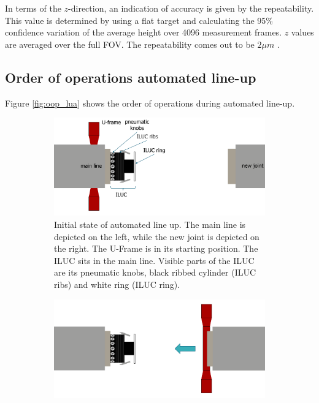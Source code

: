 In terms of the $z$-direction, an indication of accuracy is given by the repeatability. This value is determined by using a flat target and calculating the 95\% confidence variation of the average height over 4096 measurement frames. $z$ values are averaged over the full FOV. The repeatability comes out to be $2 \mu m$ \cite{gocator2650datasheet}.

\newpage
\subsection{Order of operations automated line-up} \label{ssec:oop_lua}
Figure \ref{fig:oop_lua} shows the order of operations during automated line-up.
\begin{figure}[H]
    \centering
    \begin{subfigure}{0.7\textwidth}
        \includegraphics[width=\textwidth ]{images/lua_oop_intro.png}
        \caption{Initial state of automated line up. The main line is depicted on the left,
            while the new joint is depicted on the right. The U-Frame is in its starting position. The ILUC
            sits in the main line. Visible parts of the ILUC are its pneumatic knobs, black ribbed cylinder (ILUC ribs)
            and white ring (ILUC ring).}
        \label{fig:oop_intro}
    \end{subfigure}
    \begin{subfigure}{0.7\textwidth}
        \includegraphics[width=\textwidth ]{images/lua_oop_track_new_joint.png}

\end{subfigure}
\end{figure}
